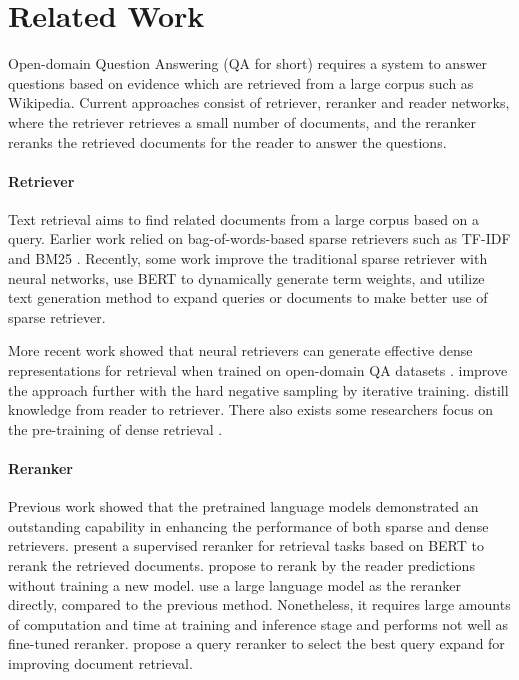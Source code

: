 \section{Related Work}
Open-domain Question Answering (QA for short) requires a system to answer questions based on evidence which are retrieved from a large corpus such as Wikipedia. Current approaches consist of retriever, reranker and reader networks, where the retriever retrieves a small number of documents, and the reranker reranks the retrieved documents for the reader to answer the questions. 

\paragraph{Retriever} Text retrieval aims to find related documents from a large corpus based on a query. Earlier work \cite{chen2017reading} relied on bag-of-words-based sparse retrievers such as TF-IDF \cite{chen2017reading} and BM25 \cite{Robertson2009ThePR}. Recently,
some work improve the traditional sparse retriever with neural networks, \citet{Dai_2019} use BERT \cite{devlin2019bert} to dynamically generate term weights, and \citet                                                {mao2021generationaugmented} utilize text generation method to expand queries or documents to make better use of sparse retriever.

More recent work showed that neural retrievers can generate effective dense representations for retrieval when trained on open-domain QA datasets \cite{karpukhin2020dense}. \citet{qu2021rocketqa} improve the approach further with the hard negative sampling by iterative training. \citet{izacard2022distilling} distill knowledge from reader to retriever. There also exists some researchers focus on the pre-training of dense retrieval \cite{gao2021condenser}.

\paragraph{Reranker} Previous work showed that the pretrained language models demonstrated an outstanding capability in enhancing the performance of both sparse and dense retrievers. \citet{nogueira2019passage} present a supervised reranker for retrieval tasks based on BERT to rerank the retrieved documents. \citet{mao2021rider} propose to rerank by the reader predictions without training a new model. \citet{sachan2022improving} use a large language model as the reranker directly,  compared to the previous method. Nonetheless, it requires large amounts of computation and time at training and inference stage and performs not well as fine-tuned reranker. \citet{chuang2023expand} propose a query reranker to select the best query expand for improving document retrieval.

